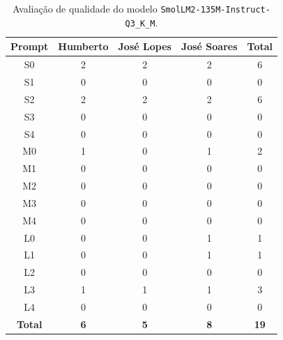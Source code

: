 \begin{table}[H]
    \centering
    \begin{tabular}{|c|c|c|c|c|}
        \hline
        \textbf{Prompt}      &
        \textbf{Humberto}    &
        \textbf{José Lopes}  &
        \textbf{José Soares} &
        \textbf{Total}       \\ \hline

        S0 & 2 & 2 & 2 & 6 \\ \hline
        S1 & 0 & 0 & 0 & 0 \\ \hline
        S2 & 2 & 2 & 2 & 6 \\ \hline
        S3 & 0 & 0 & 0 & 0 \\ \hline
        S4 & 0 & 0 & 0 & 0 \\ \hline
        M0 & 1 & 0 & 1 & 2 \\ \hline
        M1 & 0 & 0 & 0 & 0 \\ \hline
        M2 & 0 & 0 & 0 & 0 \\ \hline
        M3 & 0 & 0 & 0 & 0 \\ \hline
        M4 & 0 & 0 & 0 & 0 \\ \hline
        L0 & 0 & 0 & 1 & 1 \\ \hline
        L1 & 0 & 0 & 1 & 1 \\ \hline
        L2 & 0 & 0 & 0 & 0 \\ \hline
        L3 & 1 & 1 & 1 & 3 \\ \hline
        L4 & 0 & 0 & 0 & 0 \\ \hline

        \textbf{Total} & \textbf{6} & \textbf{5} & \textbf{8} & \textbf{19} \\ \hline
    \end{tabular}
    \caption{Avaliação de qualidade do modelo \texttt{SmolLM2-135M-Instruct-Q3\_K\_M}.}
\end{table}

